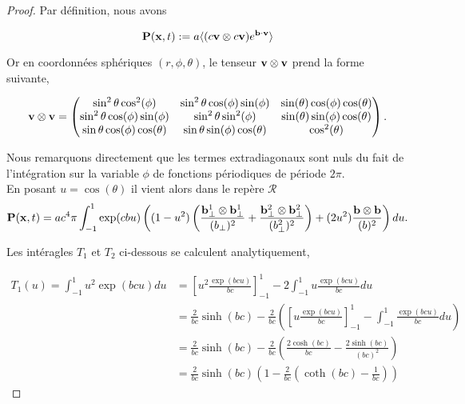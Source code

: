 \begin{proof}

  Par définition, nous avons

  \begin{equation}
    \mathbf{P}(\mathbf{x},t) := a \langle (c\mathbf{v} \otimes c\mathbf{v}) e^{\mathbf{b} \cdot \mathbf{v}} \rangle
  \end{equation}

  Or en coordonnées sphériques $(r,\phi,\theta)$, le tenseur $\mathbf{v} \otimes \mathbf{v}$
  prend la forme suivante,


  \begin{equation}
    \mathbf{v} \otimes \mathbf{v}  =
    \begin{pmatrix}
      \sin^2{\theta}\cos^2(\phi) & \sin^2{\theta}\cos(\phi)\sin(\phi) & 
      \sin(\theta)\cos(\phi)\cos(\theta)\\
      \sin^2{\theta}\cos(\phi)\sin(\phi) & \sin^2{\theta}\sin^2(\phi) 
      & \sin(\theta)\sin(\phi)\cos(\theta)\\
      \sin{\theta}\cos(\phi)\cos(\theta) & \sin{\theta}\sin(\phi)\cos(\theta) 
      & \cos^2(\theta)\\
    \end{pmatrix}.
  \end{equation}

Nous remarquons directement que les termes extradiagonaux sont nuls du fait de
l'intégration sur la variable $\phi$ de fonctions périodiques de période 
$2\pi$.\\

En posant $u = \cos(\theta)$ il vient alors dans le repère $\mathcal{R}$\\
\begin{equation}
  \mathbf{P}(\mathbf{x},t) = a c^4 \pi \int_{-1}^1 \exp(cbu)
  \left( (1-u^2)  \left( \frac{\mathbf{b}_{\perp}^1
  \otimes \mathbf{b}_{\perp}^1}{ (b_{\perp})^2} 
  +\frac{\mathbf{b}_{\perp}^2 \otimes \mathbf{b}_{\perp}^2}{ (b_{\perp}^2)^2}\right)
  + (2u^2) \frac{\mathbf{b} \otimes \mathbf{b}}{ (b)^2} \right) du.
\end{equation}



Les intéragles $T_1$ et $T_2$ ci-dessous se calculent analytiquement,

\begin{equation}
\begin{aligned}
T_1(u) = \int_{-1}^{1} u^2 \exp(bcu) du &= \left[  u^2 \frac{ \exp(bcu)}{bc} \right]^1_{-1} - 2\int_{-1}^1 u \frac{\exp(bcu)}{bc}du\\
& = \frac{2}{bc}\sinh(bc) - \frac{2}{bc} \left(  \left[  u \frac{\exp(bcu)}{bc} \right]^1_{-1} -\int_{-1}^1 \frac{\exp(bcu)}{bc} du   \right)\\
&= \frac{2}{bc}\sinh(bc) - \frac{2}{bc} \left(   \frac{2 \cosh(bc)}{bc} - \frac{2\sinh(bc)}{(bc)^2}   \right)\\
&= \frac{2}{bc}\sinh(bc) \left( 1 - \frac{2}{bc}\left(\coth(bc) - \frac{1}{bc} \right) \right)
\end{aligned}
\end{equation}


\end{proof}
